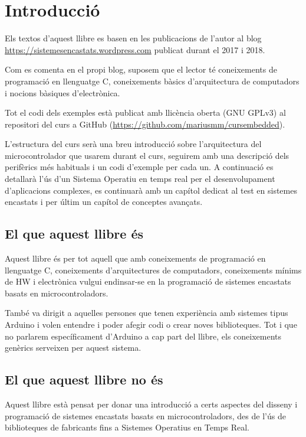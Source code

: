 
\chapter{Introducció}
Els textos d'aquest llibre es basen en les publicacions de l'autor al blog \url{https://sistemesencastats.wordpress.com} publicat durant el 2017 i 2018.

Com es comenta en el propi blog, suposem que el lector té coneixements de programació en llenguatge C, coneixements bàsics d'arquitectura de computadors i nocions bàsiques d'electrònica.

Tot el codi dels exemples està publicat amb llicència oberta (GNU GPLv3) \cite{gplv3} al repositori del curs a GitHub (\url{https://github.com/mariusmm/cursembedded}).

L'estructura del curs serà una breu introducció sobre l'arquitectura del microcontrolador que usarem durant el curs, seguirem amb una descripció dels perifèrics més habituals i un codi d'exemple per cada un. A continuació es detallarà l'ús d'un Sistema Operatiu en temps real per el desenvolupament d'aplicacions complexes, es continuarà amb un capítol dedicat al test en sistemes encastats i per últim un capítol de conceptes avançats.

\section{El que aquest llibre és}
Aquest llibre és per tot aquell que amb coneixements de programació en llenguatge C, coneixements d'arquitectures de computadors, coneixements mínims de HW i electrònica vulgui endinsar-se en la programació de sistemes encastats basats en microcontroladors.

També va dirigit a aquelles persones que tenen experiència amb sistemes tipus Arduino i volen entendre i poder afegir codi o crear noves biblioteques. Tot i que no parlarem específicament d'Arduino a cap part del llibre, els coneixements genèrics serveixen per aquest sistema.

\section{El que aquest llibre no és}
Aquest llibre està pensat per donar una introducció a certs aspectes del disseny i programació de sistemes encastats basats en microcontroladors, des de l'ús de biblioteques de fabricants fins a Sistemes Operatius en Temps Real.

